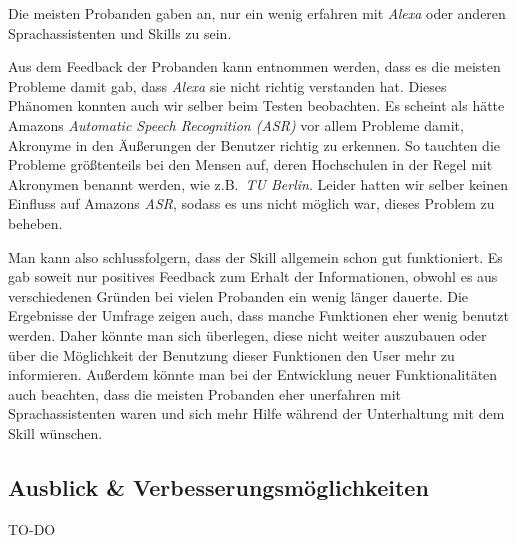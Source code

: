 \documentclass[12pt]{article}
\begin{document}
Die meisten Probanden gaben an, nur ein wenig erfahren mit \emph{Alexa} oder anderen Sprachassistenten und Skills zu sein.

Aus dem Feedback der Probanden kann entnommen werden, dass es die meisten Probleme damit gab, dass \emph{Alexa} sie nicht richtig verstanden hat.
Dieses Phänomen konnten auch wir selber beim Testen beobachten.
Es scheint als hätte Amazons \emph{Automatic Speech Recognition (ASR)} vor allem Probleme damit, Akronyme in den Äußerungen der Benutzer richtig zu erkennen.
So tauchten die Probleme größtenteils bei den Mensen auf, deren Hochschulen in der Regel mit Akronymen benannt werden, wie z.B.~\emph{TU Berlin}.
Leider hatten wir selber keinen Einfluss auf Amazons \emph{ASR}, sodass es uns nicht möglich war, dieses Problem zu beheben.

Man kann also schlussfolgern, dass der Skill allgemein schon gut funktioniert.
Es gab soweit nur positives Feedback zum Erhalt der Informationen, obwohl es aus verschiedenen Gründen bei vielen Probanden ein wenig länger dauerte.
Die Ergebnisse der Umfrage zeigen auch, dass manche Funktionen eher wenig benutzt werden.
Daher könnte man sich überlegen, diese nicht weiter auszubauen oder über die Möglichkeit der Benutzung dieser Funktionen den User mehr zu informieren.
Außerdem könnte man bei der Entwicklung neuer Funktionalitäten auch beachten, dass die meisten Probanden eher unerfahren mit Sprachassistenten waren und sich mehr Hilfe während der Unterhaltung mit dem Skill wünschen.

\subsection{Ausblick \& Verbesserungsmöglichkeiten}
TO-DO

\newpage
{}







  
  
\end{document}
